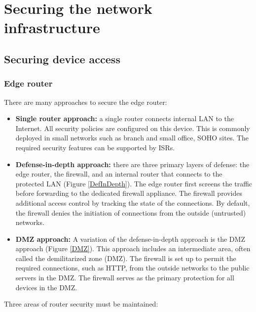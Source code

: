 \chapter{Securing the network infrastructure}

\section{Securing device access}

\subsection{Edge router}

There are many approaches to secure the edge router:

\begin{itemize}
\item \textbf{Single router approach:}  a single router connects internal LAN to the Internet.  All security policies are configured on this device. This is commonly deployed in small networks such as branch and small office, SOHO sites. The required security features can be supported by ISRs.

\item \textbf{Defense-in-depth approach:} there are three primary layers of defense: the edge router, the firewall, and an internal router that connects to the protected LAN (Figure \ref{DefInDepth}). The edge router first screens the traffic before forwarding to the dedicated firewall appliance. The firewall provides additional access control by tracking the state of the connections. By default, the firewall denies the initiation of connections from the outside (untrusted) networks. 

\item \textbf{DMZ approach:} A variation of the defense-in-depth approach is the  DMZ approach (Figure \ref{DMZ}). This approach includes an intermediate area, often called the demilitarized zone (DMZ). The firewall is set up to permit the required connections, such as HTTP, from the outside networks to the public servers in the DMZ. The firewall serves as the primary protection for all devices in the DMZ.
\end{itemize}

Three areas of router security must be maintained:

